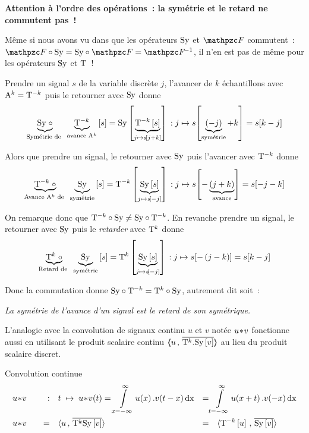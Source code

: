 \begin{remarque}
  \textbf{Attention à l'ordre des opérations~: la symétrie et le
    retard ne commutent pas~!}

  Même si nous avons vu dans  que les opérateurs
  $\mathrm{Sy}$ et $\F$ commutent~: $\F\circ\Sy=\Sy\circ\F=\Finv$, il n'en est
  pas de même pour les opérateurs $\mathrm{Sy}$ et $\mathrm{T}$~!

  Prendre un signal $s$ de la variable discrète $j$, l'avancer de $k$
  échantillons avec $\mathrm{A}^k=\mathrm{T}^{-k}$ puis le retourner avec
  $\mathrm{Sy}$ donne
  $$\underbrace{\mathrm{Sy}\;\circ}_{\text{Symétrie de }}\;\underbrace{\mathrm{T}^{-k}}_{\text{avance }\mathrm{A}^k}\left[s\right] = \mathrm{Sy}\left[\underbrace{\mathrm{T}^{-k}\left[s\right]}_{j\mapsto s\!\left[j+k\right]}\right]\,: j\mapsto s\!\left[\underbrace{\left(-j\right)}_{\text{symétrie}}+k\right]=s\!\left[k-j\right]$$

  Alors que prendre un signal, le retourner avec $\mathrm{Sy}$ puis l'avancer
  avec $\mathrm{T}^{-k}$ donne
  $$\underbrace{\mathrm{T}^{-k}\;\circ}_{\text{Avance }\mathrm{A}^k\text{ de }}\;\underbrace{\mathrm{Sy}}_{\text{symétrie}}\left[s\right]= \mathrm{T}^{-k}\left[\underbrace{\mathrm{Sy}\left[s\right]}_{j\mapsto s\!\left[-j\right]}\right]\,: j\mapsto s
  \!\left[-\underbrace{\left(j+k\right)}_{\text{avance}}\right]=s\!\left[-j-k\right]$$

  On remarque donc que $\mathrm{T}^{-k}\circ\mathrm{Sy}\neq\mathrm{Sy}\circ\mathrm{T}^{-k}$. En
  revanche prendre un signal, le retourner avec $\mathrm{Sy}$ puis le \emph{retarder}
  avec $\mathrm{T}^{k}$ donne
  $$\underbrace{\mathrm{T}^{k}\;\circ}_{\text{Retard de }}\;\underbrace{\mathrm{Sy}}_{\text{symétrie}}\left[s\right]= \mathrm{T}^{k}\left[\underbrace{\mathrm{Sy}\left[s\right]}_{j\mapsto s\!\left[-j\right]}\right]\,: j\mapsto s\!\left[-\left(j-k\right)\right]=s\!\left[k-j\right]$$

  Donc la commutation donne $\mathrm{Sy}\circ\mathrm{T}^{-k}=\mathrm{T}^{k}\circ\mathrm{Sy}$,
  autrement dit soit~:

\emph{  \og{} La symétrie de l'avance d'un signal est le retard de son
  symétrique\fg.}
\end{remarque}

L'analogie avec la convolution de signaux continu $u$ et $v$ notée
$u\!\ast\! v$ fonctionne aussi en utilisant le produit scalaire continu
$\langle\!\!\langle u\,,\,\overline{\mathrm{T}^k.\mathrm{Sy}\left[v\right]}\rangle\!\!\rangle$ au lieu du produit scalaire discret.

\begin{definition}{Convolution continue}
  \begin{align}
    \label{eq:convolution_continue}
    &u\conv v \quad &:& \quad  t \;\mapsto\; u\conv v\de{t} =\integ{x=-\infty}{\infty}{u\de{x}.v\de{t-x}\dx} &=& \integ{t=-\infty}{\infty}{u\de{x+t}.v\de{-x}\dx} \nonumber\\
    &u\conv v & = & \quad \scal{u}{\conj{\oret^k\Sy\b{v}}} &=& \quad\scal{\oret^{-k}\b{u}}{\conj{\Sy\b{v}}} 
  \end{align}
\end{definition}


